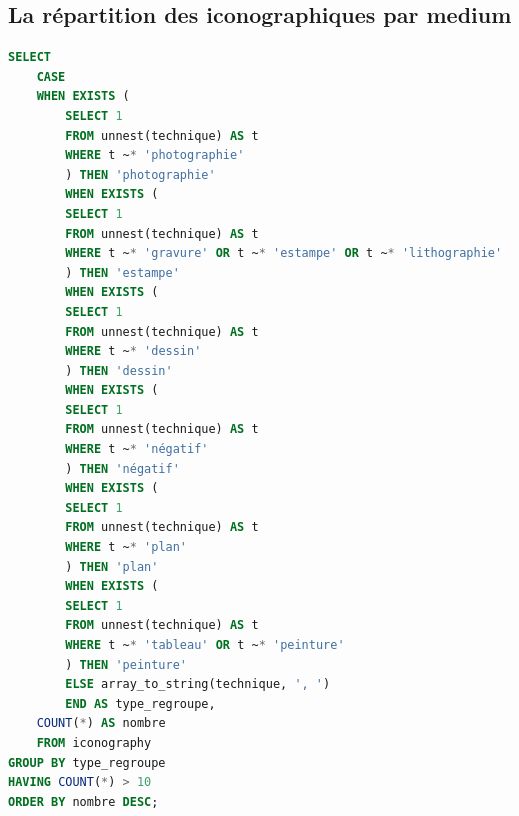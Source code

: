 
\newpage
\subsection{La répartition des iconographiques par medium}
\begin{lstlisting}[language=SQL, caption=Requête SQL pour nombre d'iconographies par technique]
SELECT 
    CASE 
    WHEN EXISTS (
        SELECT 1 
        FROM unnest(technique) AS t
        WHERE t ~* 'photographie'
        ) THEN 'photographie'
        WHEN EXISTS (
        SELECT 1 
        FROM unnest(technique) AS t
        WHERE t ~* 'gravure' OR t ~* 'estampe' OR t ~* 'lithographie'
        ) THEN 'estampe'
        WHEN EXISTS (
        SELECT 1 
        FROM unnest(technique) AS t
        WHERE t ~* 'dessin'
        ) THEN 'dessin'
        WHEN EXISTS (
        SELECT 1 
        FROM unnest(technique) AS t
        WHERE t ~* 'négatif'
        ) THEN 'négatif'
        WHEN EXISTS (
        SELECT 1 
        FROM unnest(technique) AS t
        WHERE t ~* 'plan'
        ) THEN 'plan'
        WHEN EXISTS (
        SELECT 1 
        FROM unnest(technique) AS t
        WHERE t ~* 'tableau' OR t ~* 'peinture'
        ) THEN 'peinture'
        ELSE array_to_string(technique, ', ')
        END AS type_regroupe,
    COUNT(*) AS nombre
    FROM iconography
GROUP BY type_regroupe
HAVING COUNT(*) > 10
ORDER BY nombre DESC; \end{lstlisting}

